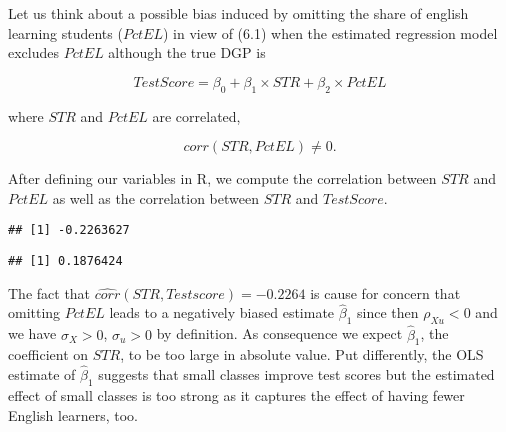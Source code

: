\documentclass[]{book}
\newenvironment{Shaded}{\begin{snugshade}}{\end{snugshade}}
\newcommand{\KeywordTok}[1]{\textcolor[rgb]{0.13,0.29,0.53}{\textbf{#1}}}
\newcommand{\DecValTok}[1]{\textcolor[rgb]{0.00,0.00,0.81}{#1}}
\newcommand{\StringTok}[1]{\textcolor[rgb]{0.31,0.60,0.02}{#1}}
\newcommand{\CommentTok}[1]{\textcolor[rgb]{0.56,0.35,0.01}{\textit{#1}}}
\newcommand{\OperatorTok}[1]{\textcolor[rgb]{0.81,0.36,0.00}{\textbf{#1}}}
\newcommand{\NormalTok}[1]{#1}
\theoremstyle{definition}
\theoremstyle{definition}
\theoremstyle{definition}
\theoremstyle{remark}
\begin{document}
Let us think about a possible bias induced by omitting the share of
english learning students (\(PctEL\)) in view of (6.1) when the
estimated regression model excludes \(PctEL\) although the true DGP is

\[ TestScore = \beta_0 + \beta_1 \times STR + \beta_2 \times PctEL \tag{6.2}\]

where \(STR\) and \(PctEL\) are correlated,

\[corr(STR,PctEL)\neq0.\]

After defining our variables in R, we compute the correlation between
\(STR\) and \(PctEL\) as well as the correlation between \(STR\) and
\(TestScore\).

\begin{Shaded}
\end{Shaded}

\begin{verbatim}
## [1] -0.2263627
\end{verbatim}

\begin{Shaded}
\end{Shaded}

\begin{verbatim}
## [1] 0.1876424
\end{verbatim}

The fact that \(\widehat{corr}(STR, Testscore) = -0.2264\) is cause for
concern that omitting \(PctEL\) leads to a negatively biased estimate
\(\hat\beta_1\) since then \(\rho_{Xu} < 0\) and we have \(\sigma_X>0\),
\(\sigma_u>0\) by definition. As consequence we expect \(\hat\beta_1\),
the coefficient on \(STR\), to be too large in absolute value. Put
differently, the OLS estimate of \(\hat\beta_1\) suggests that small
classes improve test scores but the estimated effect of small classes is
too strong as it captures the effect of having fewer English learners,
too.
\end{document}
